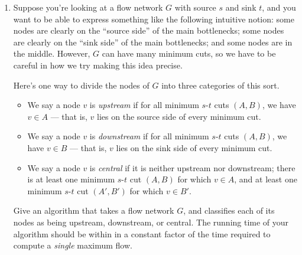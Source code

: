 \documentclass[12pt]{article}
\begin{document}
\begin{enumerate}
{}



\item

Suppose you're looking at a flow network $G$
with source $s$ and sink $t$, and
you want to be able to express something like the following
intuitive notion: some nodes are clearly on the ``source side''
of the main bottlenecks; some nodes are clearly on the ``sink side''
of the main bottlenecks; and some nodes are in the middle.
However, $G$ can have many minimum cuts, so we have
to be careful in how we try making this idea precise.

Here's one way to divide the nodes of $G$ into three
categories of this sort.
\begin{itemize}
\item We say a node $v$ is
{\em upstream} if for all minimum $s$-$t$ cuts $(A,B)$, we have
$v \in A$ --- that is, $v$ lies on the source side of every minimum cut.
\item We say a node $v$ is
{\em downstream} if for all minimum $s$-$t$ cuts $(A,B)$, we have
$v \in B$ --- that is, $v$ lies on the sink side of every minimum cut.
\item We say a node $v$ is
{\em central} if it is neither upstream nor downstream;
there is at least one minimum $s$-$t$ cut $(A,B)$ for which $v \in A$,
and at least one minimum $s$-$t$ cut $(A',B')$ for which $v \in B'$.
\end{itemize}

Give an algorithm that takes a flow network $G$, and
classifies each of its nodes as being upstream, downstream, or central.
The running time of your algorithm should be within in a constant
factor of the time required to compute a {\em single} maximum flow.

\end{enumerate}
\end{document}
